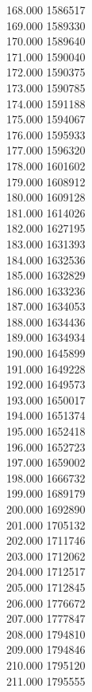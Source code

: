 { 168.000	1586517 \\
 169.000	1589330 \\
 170.000	1589640 \\
 171.000	1590040 \\
 172.000	1590375 \\
 173.000	1590785 \\
 174.000	1591188 \\
 175.000	1594067 \\
 176.000	1595933 \\
 177.000	1596320 \\
 178.000	1601602 \\
 179.000	1608912 \\
 180.000	1609128 \\
 181.000	1614026 \\
 182.000	1627195 \\
 183.000	1631393 \\
 184.000	1632536 \\
 185.000	1632829 \\
 186.000	1633236 \\
 187.000	1634053 \\
 188.000	1634436 \\
 189.000	1634934 \\
 190.000	1645899 \\
 191.000	1649228 \\
 192.000	1649573 \\
 193.000	1650017 \\
 194.000	1651374 \\
 195.000	1652418 \\
 196.000	1652723 \\
 197.000	1659002 \\
 198.000	1666732 \\
 199.000	1689179 \\
 200.000	1692890 \\
 201.000	1705132 \\
 202.000	1711746 \\
 203.000	1712062 \\
 204.000	1712517 \\
 205.000	1712845 \\
 206.000	1776672 \\
 207.000	1777847 \\
 208.000	1794810 \\
 209.000	1794846 \\
 210.000	1795120 \\
 211.000	1795555 \\
}
